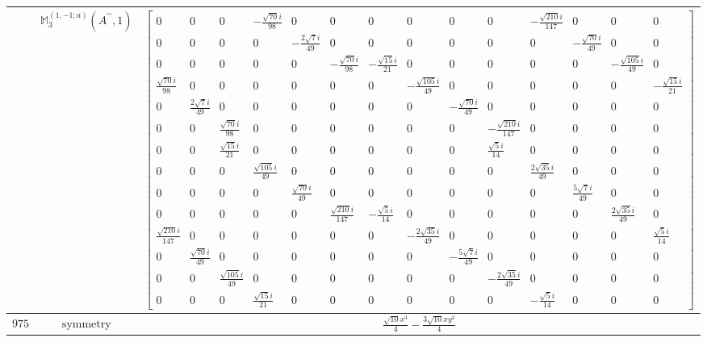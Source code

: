 \documentclass[fleqn,8pt,landscape]{jsarticle}
\begin{document}
\begin{longtable}{ccc}
$  $ & $ \mathbb{M}_{3}^{(1,-1;a)}(A^{\prime\prime},1) $ & $ \begin{bmatrix} 0 & 0 & 0 & - \frac{\sqrt{70} i}{98} & 0 & 0 & 0 & 0 & 0 & 0 & - \frac{\sqrt{210} i}{147} & 0 & 0 & 0 \\ 0 & 0 & 0 & 0 & - \frac{2 \sqrt{7} i}{49} & 0 & 0 & 0 & 0 & 0 & 0 & - \frac{\sqrt{70} i}{49} & 0 & 0 \\ 0 & 0 & 0 & 0 & 0 & - \frac{\sqrt{70} i}{98} & - \frac{\sqrt{15} i}{21} & 0 & 0 & 0 & 0 & 0 & - \frac{\sqrt{105} i}{49} & 0 \\ \frac{\sqrt{70} i}{98} & 0 & 0 & 0 & 0 & 0 & 0 & - \frac{\sqrt{105} i}{49} & 0 & 0 & 0 & 0 & 0 & - \frac{\sqrt{15} i}{21} \\ 0 & \frac{2 \sqrt{7} i}{49} & 0 & 0 & 0 & 0 & 0 & 0 & - \frac{\sqrt{70} i}{49} & 0 & 0 & 0 & 0 & 0 \\ 0 & 0 & \frac{\sqrt{70} i}{98} & 0 & 0 & 0 & 0 & 0 & 0 & - \frac{\sqrt{210} i}{147} & 0 & 0 & 0 & 0 \\ 0 & 0 & \frac{\sqrt{15} i}{21} & 0 & 0 & 0 & 0 & 0 & 0 & \frac{\sqrt{5} i}{14} & 0 & 0 & 0 & 0 \\ 0 & 0 & 0 & \frac{\sqrt{105} i}{49} & 0 & 0 & 0 & 0 & 0 & 0 & \frac{2 \sqrt{35} i}{49} & 0 & 0 & 0 \\ 0 & 0 & 0 & 0 & \frac{\sqrt{70} i}{49} & 0 & 0 & 0 & 0 & 0 & 0 & \frac{5 \sqrt{7} i}{49} & 0 & 0 \\ 0 & 0 & 0 & 0 & 0 & \frac{\sqrt{210} i}{147} & - \frac{\sqrt{5} i}{14} & 0 & 0 & 0 & 0 & 0 & \frac{2 \sqrt{35} i}{49} & 0 \\ \frac{\sqrt{210} i}{147} & 0 & 0 & 0 & 0 & 0 & 0 & - \frac{2 \sqrt{35} i}{49} & 0 & 0 & 0 & 0 & 0 & \frac{\sqrt{5} i}{14} \\ 0 & \frac{\sqrt{70} i}{49} & 0 & 0 & 0 & 0 & 0 & 0 & - \frac{5 \sqrt{7} i}{49} & 0 & 0 & 0 & 0 & 0 \\ 0 & 0 & \frac{\sqrt{105} i}{49} & 0 & 0 & 0 & 0 & 0 & 0 & - \frac{2 \sqrt{35} i}{49} & 0 & 0 & 0 & 0 \\ 0 & 0 & 0 & \frac{\sqrt{15} i}{21} & 0 & 0 & 0 & 0 & 0 & 0 & - \frac{\sqrt{5} i}{14} & 0 & 0 & 0 \end{bmatrix} $ \\ \hline
$ 975 $ & $ \text{symmetry} $ & $ \frac{\sqrt{10} x^{3}}{4} - \frac{3 \sqrt{10} x y^{2}}{4} $ \\

\end{longtable}
\end{document}
